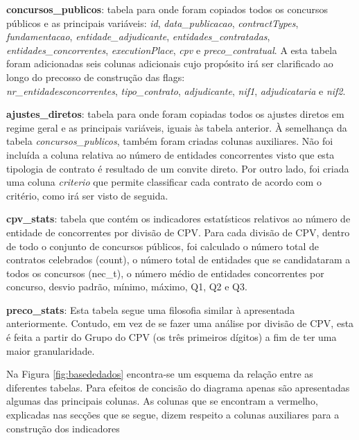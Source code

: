 \begin{my_itemize}
	\item \textbf{concursos\_publicos}: tabela para onde foram copiados todos os concursos públicos e as principais variáveis: \textit{id}, \textit{data\_publicacao}, \textit{contractTypes}, \textit{fundamentacao}, \textit{entidade\_adjudicante}, \textit{entidades\_contratadas}, \textit{entidades\_concorrentes}, \textit{executionPlace}, \textit{cpv} e \textit{preco\_contratual}. A esta tabela foram adicionadas seis colunas adicionais cujo propósito irá ser clarificado ao longo do precosso de construção das flags: \\ \textit{nr\_entidadesconcorrentes}, \textit{tipo\_contrato}, \textit{adjudicante}, \textit{nif1}, \textit{adjudicataria} e \textit{nif2}. 
	
	
	\item \textbf{ajustes\_diretos}: tabela para onde foram copiadas todos os ajustes diretos em regime geral e as principais variáveis, iguais às tabela anterior. À semelhança da tabela \textit{concursos\_publicos}, também foram criadas colunas auxiliares. Não foi incluída a coluna relativa ao número de entidades concorrentes visto que esta tipologia de contrato é resultado de um convite direto. Por outro lado, foi criada uma coluna \textit{criterio} que permite classificar cada contrato de acordo com o critério, como irá ser visto de seguida.
	
	\item \textbf{cpv\_stats}: tabela que contém os indicadores estatísticos relativos ao número de entidade de concorrentes por divisão de CPV. Para cada divisão de CPV, dentro de todo o conjunto de concursos públicos, foi calculado o número total de contratos celebrados (count), o número total de entidades que se candidataram a todos os concursos (nec\_t), o número médio de entidades concorrentes por concurso, desvio padrão, mínimo, máximo, Q1, Q2 e Q3. 
	
	\item \textbf{preco\_stats}: Esta tabela segue uma filosofia similar à apresentada anteriormente. Contudo, em vez de se fazer uma análise por divisão de CPV, esta é feita a partir do Grupo do CPV (os três primeiros dígitos) a fim de ter uma maior granularidade. 
\end{my_itemize}


Na Figura \ref{fig:basededados} encontra-se um esquema da relação entre as diferentes tabelas. Para efeitos de concisão do diagrama apenas são apresentadas algumas das principais colunas. As colunas que se encontram a vermelho, explicadas nas secções que se segue, dizem respeito a colunas auxiliares para a construção dos indicadores

